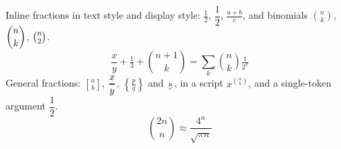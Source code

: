 \documentclass{article}
\begin{document}
Inline fractions in text style and display style: $\frac{1}{2}$, $\dfrac{1}{2}$, $\tfrac{a+b}{c}$,
and binomials $\binom{n}{k}$, $\dbinom{n}{k}$, $\tbinom{n}{2}$.
\[
\dfrac{x}{y} + \tfrac{1}{3} + \binom{n+1}{k} = \sum_{k} \binom{n}{k} \tfrac{1}{2^k}
\]
General fractions: $\genfrac{[}{]}{0pt}{}{a}{b}$, $\genfrac{}{}{1pt}{0}{x}{y}$,
$\genfrac{\{}{\}}{}{2}{p}{q}$ and $\genfrac{}{}{}{3}{u}{v}$, in a script
$x^{\binom{a}{b}}$, and a single-token argument $\dfrac12$.
\begin{equation}
\binom{2n}{n} \approx \dfrac{4^n}{\sqrt{\pi n}}
\end{equation}
\end{document}
